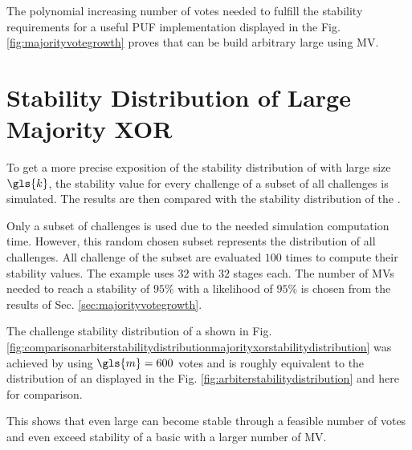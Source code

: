 The polynomial increasing number of votes needed to fulfill the stability requirements for a useful PUF implementation displayed in the Fig. \ref{fig:majorityvotegrowth} proves that \xpufs can be build arbitrary large using \ac{MV}.


\section{Stability Distribution of Large Majority \acs{XOR} \apufs}
\label{sec:distributionoflargemxpufs}

To get a more precise exposition of the stability distribution of \mxpufs with large size $\gls{k}$, the stability value for every challenge of a subset of all challenges is simulated.
The results are then compared with the stability distribution of the \apuf.

Only a subset of challenges is used due to the needed simulation computation time.
However, this random chosen subset represents the distribution of all challenges. 
All challenge of the subset are evaluated $100$ times to compute their stability values.
The example uses $32$ \mpufs with $32$ stages each.
The number of \acp{MV} needed to reach a stability of $95 \%$ with a likelihood of $95 \%$ is chosen from the results of Sec. \ref{sec:majorityvotegrowth}.

The challenge stability distribution of a \mxpuf shown in Fig. \ref{fig:comparisonarbiterstabilitydistributionmajorityxorstabilitydistribution} was achieved by using $\gls{m} = 600$ votes and is roughly equivalent to the distribution of an \apuf displayed in the Fig. \ref{fig:arbiterstabilitydistribution} and here for comparison.

This shows that even large \mxpufs can become stable through a feasible number of votes and even exceed stability of a basic \apuf with a larger number of \ac{MV}.



